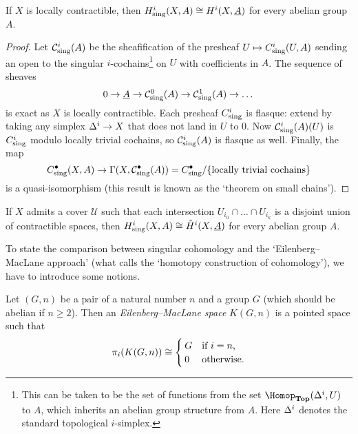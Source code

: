 \begin{prop}[name={\cite[Theorem~4.47]{voisinHodgeTheoryComplex2002}}]\label{prop:comparison-singular-cohomology-sheaf-cohomology}
If \(X\) is locally contractible, then \(H^i_{\smash{\textup{sing}}}(X,A) \cong H^i(X,\underline{A})\) for every abelian group \(A\).
\end{prop}
\begin{proof}
Let \(\mathcal C^i_{\smash{\textup{sing}}}(A)\) be the sheafification of the presheaf \(U\mapsto C^i_{\smash{\textup{sing}}}(U,A)\) sending an open to the singular \(i\)-cochains\footnote{This can be taken to be the set of functions from the set \(\Hom[\catTopologicalSpace](\simplex[i],U)\) to \(A\), which inherits an abelian group structure from \(A\). Here \(\simplex[i]\) denotes the standard topological \(i\)-simplex.} on \(U\) with coefficients in \(A\).
The sequence of sheaves
\[ 0 \to \underline{A} \to \mathcal C^0_{\smash{\textup{sing}}}(A) \to \mathcal C^1_{\smash{\textup{sing}}}(A)\to\dots \]
is exact as \(X\) is locally contractible.
Each presheaf \(C^i_{\smash{\textup{sing}}}\) is flasque: extend by taking any simplex \(\simplex[i]\to X\) that does not land in \(U\) to \(0\).
Now \(\mathcal C^i_{\smash{\textup{sing}}}(A)(U)\) is \(C^i_{\smash{\textup{sing}}}\) modulo locally trivial cochains, so \(\mathcal C^i_{\smash{\textup{sing}}}(A)\) is flasque as well.
Finally, the map
\[ C^\bullet_{\smash{\textup{sing}}}(X,A) \to \Gamma(X,\mathcal C^\bullet_{\smash{\textup{sing}}}(A)) = C^\bullet_{\smash{\textup{sing}}}/\{\text{locally trivial cochains}\} \]
is a quasi-isomorphism (this result is known as the `theorem on small chains').
\end{proof}

\begin{prop}\label{prop:comparison-singular-cohomology-Čech-cohomology}
If \(X\) admits a cover \(\mathcal U\) such that each intersection \(U_{i_0}\cap\dots\cap U_{i_k}\) is a disjoint union of contractible spaces, then \(H^i_{\smash{\textup{sing}}}(X,A)\cong\check{H}^i(X,\underline{A})\) for every abelian group \(A\).
\end{prop}

To state the comparison between singular cohomology and the `Eilenberg--MacLane approach' (what \cite{hatcherAlgebraicTopology2002} calls the `homotopy construction of cohomology'), we have to introduce some notions.

\begin{defn}\label{defn:Eilenberg-MacLane-space}
Let \((G,n)\) be a pair of a natural number \(n\) and a group \(G\) (which should be abelian if \(n\geq 2\)).
Then an \emph{Eilenberg--MacLane space} \(K(G,n)\) is a pointed space such that
\[ \homotopy[i](K(G,n)) \cong
  \begin{cases}
    G & \text{if } i = n\text{,} \\
    0 & \text{otherwise.}
  \end{cases}
\]
\end{defn}

